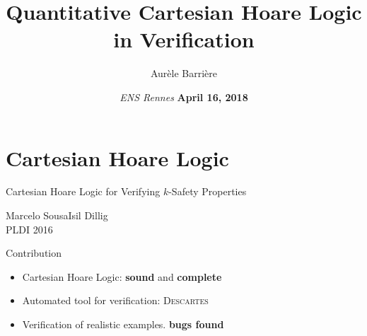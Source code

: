 \documentclass[page number]{beamer}
\def\outline{
  \begin{frame}[plain,noframenumbering]
    \frametitle{Outline}
    \tableofcontents[currentsection]
  \end{frame}
}
\begin{document}
\title[QCHL]{Quantitative Cartesian Hoare Logic in Verification}

\author[Aur\`ele Barri\`ere]{Aur\`ele Barri\`ere}

\date{\textit{ENS Rennes}
  \vfill
  \textbf{April 16, 2018}}

\def\outline{
  \begin{frame}[plain,noframenumbering]
    \frametitle{Outline}
    \tableofcontents[currentsection]
  \end{frame}
}

\begin{frame}
  \vspace{-2cm}
  \maketitle
  \vspace{-4cm}
\end{frame}



\def\spec#1{{\color{spec}\textbf{#1}}}
\def\prog#1{{\color{prog}\textbf{#1}}}

\section{Cartesian Hoare Logic}
\begin{frame}{Cartesian Hoare Logic for Verifying $k$-Safety Properties}
  \begin{center}
    Marcelo Sousa\qquad Isil Dillig\\
    PLDI 2016
  \end{center}
  \vfill
  \begin{exampleblock}{Contribution}
    \begin{itemize}
    \item Cartesian Hoare Logic: \textbf{sound} and \textbf{complete}
    \item Automated tool for verification: \textsc{Descartes}
    \item Verification of realistic examples. \textbf{bugs found}
    \end{itemize}
  \end{exampleblock}
\end{frame}
\end{document}
